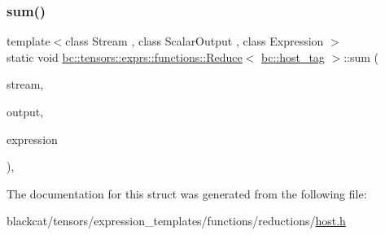 \subsubsection{\texorpdfstring{sum()}{sum()}}
{\footnotesize\ttfamily template$<$class Stream , class Scalar\+Output , class Expression $>$ \\
static void \hyperlink{structbc_1_1tensors_1_1exprs_1_1functions_1_1Reduce}{bc\+::tensors\+::exprs\+::functions\+::\+Reduce}$<$ \hyperlink{structbc_1_1host__tag}{bc\+::host\+\_\+tag} $>$\+::sum (\begin{DoxyParamCaption}\item[{\hyperlink{classbc_1_1streams_1_1Stream}{Stream}}]{stream,  }\item[{Scalar\+Output}]{output,  }\item[{Expression}]{expression }\end{DoxyParamCaption})\hspace{0.3cm}{\ttfamily [inline]}, {\ttfamily [static]}}



The documentation for this struct was generated from the following file\+:\begin{DoxyCompactItemize}
\item 
blackcat/tensors/expression\+\_\+templates/functions/reductions/\hyperlink{tensors_2expression__templates_2functions_2reductions_2host_8h}{host.\+h}\end{DoxyCompactItemize}

